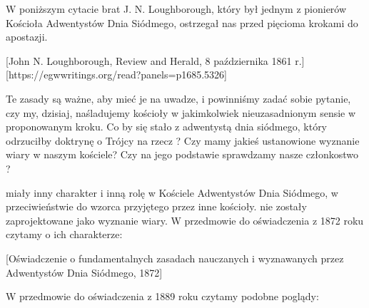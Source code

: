 
W poniższym cytacie brat J. N. Loughborough, który był jednym z pionierów Kościoła Adwentystów Dnia Siódmego, ostrzegał nas przed pięcioma krokami do apostazji.

[John N. Loughborough, Review and Herald, 8 października 1861 r.][https://egwwritings.org/read?panels=p1685.5326]

Te zasady są ważne, aby mieć je na uwadze, i powinniśmy zadać sobie pytanie, czy my, dzisiaj, naśladujemy kościoły w jakimkolwiek nieuzasadnionym sensie w proponowanym kroku. Co by się stało z adwentystą dnia siódmego, który odrzuciłby doktrynę o Trójcy na rzecz ? Czy mamy jakieś ustanowione wyznanie wiary w naszym kościele? Czy na jego podstawie sprawdzamy nasze członkostwo ?


 miały inny charakter i inną rolę w Kościele Adwentystów Dnia Siódmego, w przeciwieństwie do wzorca przyjętego przez inne kościoły.  nie zostały zaprojektowane jako wyznanie wiary. W przedmowie do oświadczenia z 1872 roku czytamy o ich charakterze:

[Oświadczenie o fundamentalnych zasadach nauczanych i wyznawanych przez Adwentystów Dnia Siódmego, 1872]

W przedmowie do oświadczenia z 1889 roku czytamy podobne poglądy:

